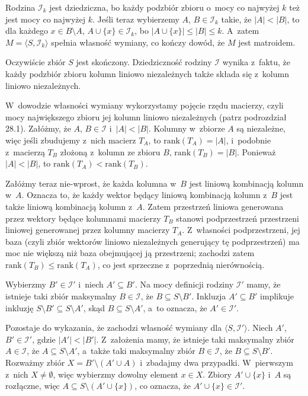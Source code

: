 
\exercise %
Rodzina $\mathcal{I}_k$ jest dziedziczna, bo każdy podzbiór zbioru o~mocy co najwyżej $k$ też jest mocy co najwyżej $k$.
Jeśli teraz wybierzemy $A$, $B\in\mathcal{I}_k$ takie, że $|A|<|B|$, to dla każdego $x\in B\setminus A$, $A\cup\{x\}\in\mathcal{I}_k$, bo $|A\cup\{x\}|\le|B|\le k$.
A~zatem $M=\langle S,\mathcal{I}_k\rangle$ spełnia własność wymiany, co kończy dowód, że $M$ jest matroidem.

\exercise %

\noindent Oczywiście zbiór $S$ jest skończony.
Dziedziczność rodziny $\mathcal{I}$ wynika z~faktu, że każdy podzbiór zbioru kolumn liniowo niezależnych także składa się z~kolumn liniowo niezależnych.

W~dowodzie własności wymiany wykorzystamy pojęcie rzędu macierzy, czyli mocy największego zbioru jej kolumn liniowo niezależnych (patrz podrozdział 28.1).
Załóżmy, że $A$, $B\in\mathcal{I}$ i~$|A|<|B|$.
Kolumny w~zbiorze $A$ są niezależne, więc jeśli zbudujemy z~nich macierz $T_A$, to $\mathrm{rank}(T_A)=|A|$, i~podobnie z~macierzą $T_B$ złożoną z~kolumn ze zbioru $B$, $\mathrm{rank}(T_B)=|B|$.
Ponieważ $|A|<|B|$, to $\mathrm{rank}(T_A)<\mathrm{rank}(T_B)$.

Załóżmy teraz nie-wprost, że każda kolumna w~$B$ jest liniową kombinacją kolumn w~$A$.
Oznacza to, że każdy wektor będący liniową kombinacją kolumn z~$B$ jest także liniową kombinacją kolumn z~$A$.
Zatem przestrzeń liniowa generowana przez wektory będące kolumnami macierzy $T_B$ stanowi podprzestrzeń przestrzeni liniowej generowanej przez kolumny macierzy $T_A$.
Z~własności podprzestrzeni, jej baza (czyli zbiór wektorów liniowo niezależnych generujący tę podprzestrzeń) ma moc nie większą niż baza obejmującej ją przestrzeni; zachodzi zatem $\mathrm{rank}(T_B)\le\mathrm{rank}(T_A)$, co jest sprzeczne z~poprzednią nierównością.

\exercise %
Wybierzmy $B'\in\mathcal{I}'$ i~niech $A'\subseteq B'$.
Na mocy definicji rodziny $\mathcal{I}'$ mamy, że istnieje taki zbiór maksymalny $B\in\mathcal{I}$, że $B\subseteq S\setminus B'$.
Inkluzja $A'\subseteq B'$ implikuje inkluzję $S\setminus B'\subseteq S\setminus A'$, skąd $B\subseteq S\setminus A'$, a~to oznacza, że $A'\in\mathcal{I}'$.

Pozostaje do wykazania, że zachodzi własność wymiany dla $\langle S,\mathcal{I}'\rangle$.
Niech $A'$, $B'\in\mathcal{I}'$, gdzie $|A'|<|B'|$.
Z~założenia mamy, że istnieje taki maksymalny zbiór $A\in\mathcal{I}$, że $A\subseteq S\setminus A'$, a~także taki maksymalny zbiór $B\in\mathcal{I}$, że $B\subseteq S\setminus B'$.
Rozważmy zbiór $X=B'\setminus(A'\cup A)$ i~zbadajmy dwa przypadki.
W~pierwszym z~nich $X\ne\emptyset$, więc wybierzmy dowolny element $x\in X$.
Zbiory $A'\cup\{x\}$ i~$A$ są rozłączne, więc $A\subseteq S\setminus(A'\cup\{x\})$, co oznacza, że $A'\cup\{x\}\in\mathcal{I}'$.


